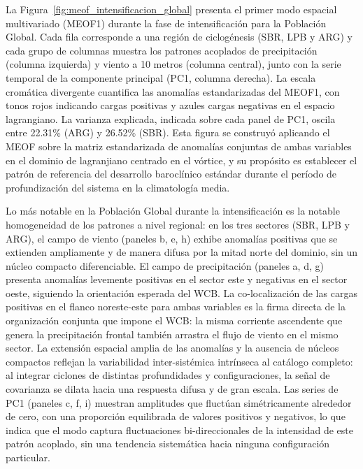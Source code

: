 La Figura~\ref{fig:meof_intensificacion_global} presenta el primer modo espacial multivariado (MEOF1) durante la fase de intensificación para la Población Global. 
Cada fila corresponde a una región de ciclogénesis (SBR, LPB y ARG) y cada grupo de columnas muestra los patrones acoplados de precipitación (columna izquierda) y viento a 10 metros (columna central), junto con la serie temporal de la componente principal (PC1, columna derecha). 
La escala cromática divergente cuantifica las anomalías estandarizadas del MEOF1, con tonos rojos indicando cargas positivas y azules cargas negativas en el espacio lagrangiano. La varianza explicada, indicada sobre cada panel de PC1, oscila entre 22.31\% (ARG) y 26.52\% (SBR). 
Esta figura se construyó aplicando el MEOF sobre la matriz estandarizada de anomalías conjuntas de ambas variables en el dominio de lagranjiano centrado en el vórtice, y su propósito es establecer el patrón de referencia del desarrollo baroclínico estándar durante el período de profundización del sistema en la climatología media.

Lo más notable en la Población Global durante la intensificación es la notable homogeneidad de los patrones a nivel regional: en los tres sectores (SBR, LPB y ARG), el campo de viento (paneles b, e, h) exhibe anomalías positivas que se extienden ampliamente y de manera difusa por la mitad norte del dominio, sin un núcleo compacto diferenciable. 
El campo de precipitación (paneles a, d, g) presenta anomalías levemente positivas en el sector este y negativas en el sector oeste, siguiendo la orientación esperada del WCB. La co-localización de las cargas positivas en el flanco noreste-este para ambas variables es la firma directa de la organización conjunta que impone el WCB: la misma corriente ascendente que genera la precipitación frontal también arrastra el flujo de viento en el mismo sector. 
La extensión espacial amplia de las anomalías y la ausencia de núcleos compactos reflejan la variabilidad inter-sistémica intrínseca al catálogo completo: al integrar ciclones de distintas profundidades y configuraciones, la señal de covarianza se dilata hacia una respuesta difusa y de gran escala. 
Las series de PC1 (paneles c, f, i) muestran amplitudes que fluctúan simétricamente alrededor de cero, con una proporción equilibrada de valores positivos y negativos, lo que indica que el modo captura fluctuaciones bi-direccionales de la intensidad de este patrón acoplado, sin una tendencia sistemática hacia ninguna configuración particular.

